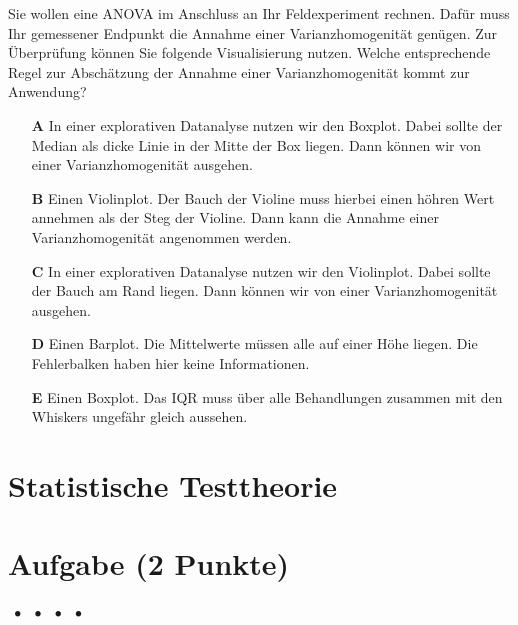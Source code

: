 \documentclass[a4paper, 9pt]{scrartcl}\usepackage[]{graphicx}\usepackage[]{xcolor}
\begin{document}
Sie wollen eine ANOVA im Anschluss an Ihr Feldexperiment rechnen. Dafür muss Ihr gemessener Endpunkt die Annahme einer Varianzhomogenität genügen. Zur Überprüfung können Sie folgende Visualisierung nutzen. Welche entsprechende Regel zur Abschätzung der Annahme einer Varianzhomogenität kommt zur Anwendung?



\begin{enumerate}
\item [\textbf{A} \msquare] In einer explorativen Datanalyse nutzen wir den Boxplot. Dabei sollte der Median als dicke Linie in der Mitte der Box liegen. Dann können wir von einer Varianzhomogenität ausgehen.
\item [\textbf{B} \msquare] Einen Violinplot. Der Bauch der Violine muss hierbei einen höhren Wert annehmen als der Steg der Violine. Dann kann die Annahme einer Varianzhomogenität angenommen werden.
\item [\textbf{C} \msquare] In einer explorativen Datanalyse nutzen wir den Violinplot. Dabei sollte der Bauch am Rand liegen. Dann können wir von einer Varianzhomogenität ausgehen.
\item [\textbf{D} \msquare] Einen Barplot. Die Mittelwerte müssen alle auf einer Höhe liegen. Die Fehlerbalken haben hier keine Informationen.
\item [\textbf{E} \msquare] Einen Boxplot. Das IQR muss über alle Behandlungen zusammen mit den Whiskers ungefähr gleich aussehen.
\end{enumerate}
\section*{Statistische Testtheorie}  

\section{Aufgabe \hfill (2 Punkte)}

\ifcollection
\begin{flushright}
\tiny\vspace{-2Ex}
\textbf{\examinhaltstart}
\exammodulemathstat $\;\bullet$
\exammodulestat $\;\bullet$
\exammodulestatbbv $\;\bullet$
\exammodulestatversuch $\;\bullet$
\exammodulebiostat
\vspace{-1Ex}
\end{flushright}
\fi
\end{document}
